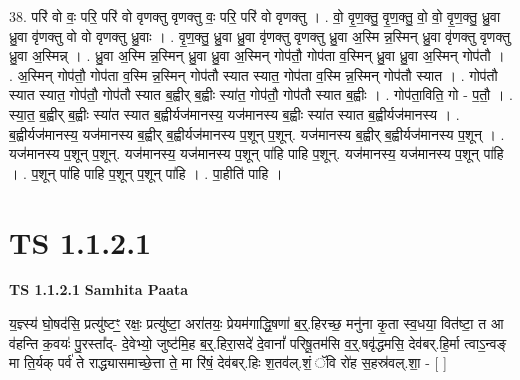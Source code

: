 \documentclass[17pt]{extarticle}
\begin{document}
38. परि॑ वो वः॒ परि॒ परि॑ वो वृणक्तु वृणक्तु वः॒ परि॒ परि॑ वो वृणक्तु । . वो॒ वृ॒ण॒क्तु॒ वृ॒ण॒क्तु॒ वो॒ वो॒ वृ॒ण॒क्तु॒ ध्रु॒वा ध्रु॒वा वृ॑णक्तु वो वो वृणक्तु ध्रु॒वाः । . वृ॒ण॒क्तु॒ ध्रु॒वा ध्रु॒वा वृ॑णक्तु वृणक्तु ध्रु॒वा अ॒स्मि न्न॒स्मिन् ध्रु॒वा वृ॑णक्तु वृणक्तु ध्रु॒वा अ॒स्मिन्न् । . ध्रु॒वा अ॒स्मि न्न॒स्मिन् ध्रु॒वा ध्रु॒वा अ॒स्मिन् गोप॑तौ॒ गोप॑ता व॒स्मिन् ध्रु॒वा ध्रु॒वा अ॒स्मिन् गोप॑तौ । . अ॒स्मिन् गोप॑तौ॒ गोप॑ता व॒स्मि न्न॒स्मिन् गोप॑तौ स्यात स्यात॒ गोप॑ता व॒स्मि न्न॒स्मिन् गोप॑तौ स्यात । . गोप॑तौ स्यात स्यात॒ गोप॑तौ॒ गोप॑तौ स्यात ब॒ह्वीर् ब॒ह्वीः स्या॑त॒ गोप॑तौ॒ गोप॑तौ स्यात ब॒ह्वीः । . गोप॑ता॒विति॒ गो - प॒तौ॒ । . स्या॒त॒ ब॒ह्वीर् ब॒ह्वीः स्या॑त स्यात ब॒ह्वीर्यज॑मानस्य॒ यज॑मानस्य ब॒ह्वीः स्या॑त स्यात ब॒ह्वीर्यज॑मानस्य । . ब॒ह्वीर्यज॑मानस्य॒ यज॑मानस्य ब॒ह्वीर् ब॒ह्वीर्यज॑मानस्य प॒शून् प॒शून्. यज॑मानस्य ब॒ह्वीर् ब॒ह्वीर्यज॑मानस्य प॒शून् । . यज॑मानस्य प॒शून् प॒शून्. यज॑मानस्य॒ यज॑मानस्य प॒शून् पा॑हि पाहि प॒शून्. यज॑मानस्य॒ यज॑मानस्य प॒शून् पा॑हि । . प॒शून् पा॑हि पाहि प॒शून् प॒शून् पा॑हि । . पा॒हीति॑ पाहि । \newline
\pagebreak
{}

\section{ TS 1.1.2.1 }

\textbf{TS 1.1.2.1 } \newline
\textbf{Samhita Paata} \newline

य॒ज्ञ्स्य॑ घो॒षद॑सि॒ प्रत्यु॑ष्टꣳ॒॒ रक्षः॒ प्रत्यु॑ष्टा॒ अरा॑तयः॒ प्रेयम॑गाद्धि॒षणा॑ ब॒र्॒.हिरच्छ॒ मनु॑ना कृ॒ता स्व॒धया॒ वित॑ष्टा॒ त आ व॑हन्ति क॒वयः॑ पु॒रस्ता᳚द्- दे॒वेभ्यो॒ जुष्ट॑मि॒ह ब॒र्॒.हिरा॒सदे॑ दे॒वानां᳚ परिषू॒तम॑सि व॒र्॒.षवृ॑द्धमसि॒ देव॑बर्.हि॒र्मा त्वाऽ॒न्वङ् मा ति॒र्यक् पर्व॑ ते राद्ध्यासमाच्छे॒त्ता ते॒ मा रि॑षं॒ देव॑बर्.हिः श॒तव॑ल्.शं॒ ॅवि रो॑ह स॒हस्र॑वल्.शा॒ - [ ] \newline
\end{document}
